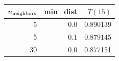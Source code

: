 \begin{tabular}{rrr}\toprule
$n_{\rm neighbors}$ & min\_dist & $T(15)$\\\midrule
5 & 0.0 & 0.890139\\
5 & 0.1 & 0.879145\\
30 & 0.0 & 0.877151\\
\bottomrule\end{tabular}
